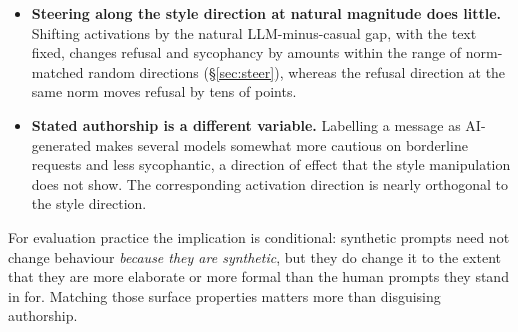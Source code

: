 \begin{itemize}
\item \textbf{Steering along the style direction at natural magnitude does little.} Shifting activations by the natural LLM-minus-casual gap, with the text fixed, changes refusal and sycophancy by amounts within the range of norm-matched random directions (\S\ref{sec:steer}), whereas the refusal direction at the same norm moves refusal by tens of points.
\item \textbf{Stated authorship is a different variable.} Labelling a message as AI-generated makes several models somewhat more cautious on borderline requests and less sycophantic, a direction of effect that the style manipulation does not show. The corresponding activation direction is nearly orthogonal to the style direction.
\end{itemize}

For evaluation practice the implication is conditional: synthetic prompts need not change behaviour \emph{because they are synthetic}, but they do change it to the extent that they are more elaborate or more formal than the human prompts they stand in for. Matching those surface properties matters more than disguising authorship.
